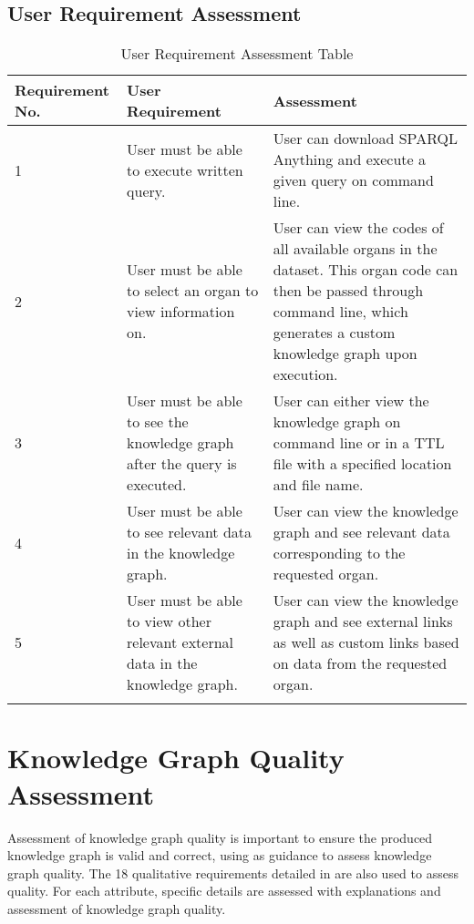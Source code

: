 \subsection{User Requirement Assessment}

\begin{longtable}{|p{2.25cm}|p{4.5cm}|p{6.5cm}|}
\hline
\textbf{Requirement No.} & \textbf{User Requirement} & \textbf{Assessment}\\
\hline

1& 
User must be able to execute written query. &
User can download SPARQL Anything \cite{sparqlanythinggithub} and execute a given query on command line. \\
\hline

2&
User must be able to select an organ to view information on. &
User can view the codes of all available organs in the dataset. This organ code can then be passed through command line, which generates a custom knowledge graph upon execution. \\
\hline

3&
User must be able to see the knowledge graph after the query is executed. &
User can either view the knowledge graph on command line or in a TTL file with a specified location and file name. \\
\hline

4&
User must be able to see relevant data in the knowledge graph. &
User can view the knowledge graph and see relevant data corresponding to the requested organ. \\
\hline

5&
User must be able to view other relevant external data in the knowledge graph. &
User can view the knowledge graph and see external links as well as custom links based on data from the requested organ. \\ 
\hline

\caption{User Requirement Assessment Table}
\end{longtable}
\vspace{-1.1cm}

\section{Knowledge Graph Quality Assessment}
\hspace{0.5cm} Assessment of knowledge graph quality is important to ensure the produced knowledge graph is valid and correct, using \cite{knowledgegraphevaulationbook} as guidance to assess knowledge graph quality. The 18 qualitative requirements detailed in \cite{evaluationpaper} are also used to assess quality. For each attribute, specific details are assessed with explanations and assessment of knowledge graph quality. 


